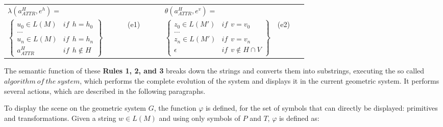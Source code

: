 \documentclass{svmult}
\begin{document}
\begin{tabular} {p{0.4\linewidth}p{0.1\linewidth}|p{0.4\linewidth}p{0.1\linewidth}}

    $
    \lambda (a_{ATTR}^{H}, e^{h})=
    $
    & 
	&
	\ \ $   
    \theta (a_{ATTR}^H, e^v) =
    $
    &

    \\
    
    $
    \left\{
    \begin{array}{ll}
        u_0 \in L(M) & \mathit{if}  \ \ h = h_0 \\
        \hdots \\
        u_n \in L(M) & \mathit{if}  \ \ h = h_n \\
        a_{ATTR}^{H}  & \mathit{if}  \ \ h \notin H
    \end{array}\right\}
    $
	&
	(e1)
	&
	\ \ 
	$
    \left\{
    \begin{array}{ll}
        z_0 \in L(M') & \mathit{if}  \ \ v = v_0 \\
        \hdots \\
        z_n \in L(M') & \mathit{if}  \ \ v = v_n \\
        \epsilon  & \mathit{if}  \ \ v \notin H \cap V
    \end{array}\right\}
    $
    &
    (e2)

\end{tabular}

%



The semantic function of these \textbf{Rules 1, 2, and 3} breaks down the strings and converts them into substrings, executing the so called $algorithm \ of \ the \ system$, which performs the complete evolution of the system and displays it in the current geometric system. It performs several actions, which are described in the following paragraphs.

To display the scene on the geometric system $G$, the function $\varphi$ is defined, for the set of symbols that can directly be displayed:  primitives and transformations. Given a
string $w \in L(M)$ and using only symbols of $P$ and $T$, $\varphi$ is defined as:
\end{document}
